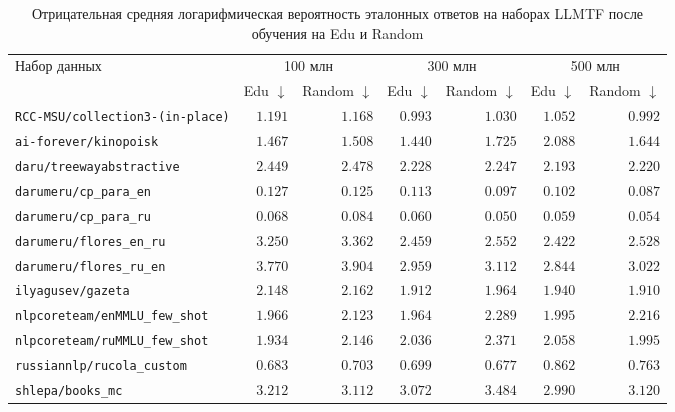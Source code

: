 \documentclass[12pt,a4paper]{article}
\begin{document}
\begin{table}[htbp]
\centering
\footnotesize
\setlength{\tabcolsep}{3pt}
\caption{Отрицательная средняя логарифмическая вероятность эталонных ответов
на наборах LLMTF после обучения на Edu и Random}
\label{tab:edu-random-pretraining}
\begin{tabular}{@{}lrrrrrr@{}}
\toprule
Набор данных & \multicolumn{2}{c}{100 млн}
& \multicolumn{2}{c}{300 млн}
& \multicolumn{2}{c}{500 млн} \\
\cmidrule(lr){2-3}\cmidrule(lr){4-5}\cmidrule(lr){6-7}
& Edu $\downarrow$ & Random $\downarrow$
& Edu $\downarrow$ & Random $\downarrow$
& Edu $\downarrow$ & Random $\downarrow$ \\
\midrule
\texttt{RCC-MSU/collection3-(in-place)}
& $1.191$ & $\mathbf{1.168}$ & $\mathbf{0.993}$ & $1.030$ & $1.052$ & $\mathbf{0.992}$ \\
\texttt{ai-forever/kinopoisk}
& $\mathbf{1.467}$ & $1.508$ & $\mathbf{1.440}$ & $1.725$ & $2.088$ & $\mathbf{1.644}$ \\
\texttt{daru/treewayabstractive}
& $\mathbf{2.449}$ & $2.478$ & $\mathbf{2.228}$ & $2.247$ & $\mathbf{2.193}$ & $2.220$ \\
\texttt{darumeru/cp\_para\_en}
& $0.127$ & $\mathbf{0.125}$ & $0.113$ & $\mathbf{0.097}$ & $0.102$ & $\mathbf{0.087}$ \\
\texttt{darumeru/cp\_para\_ru}
& $\mathbf{0.068}$ & $0.084$ & $0.060$ & $\mathbf{0.050}$ & $0.059$ & $\mathbf{0.054}$ \\
\texttt{darumeru/flores\_en\_ru}
& $\mathbf{3.250}$ & $3.362$ & $\mathbf{2.459}$ & $2.552$ & $\mathbf{2.422}$ & $2.528$ \\
\texttt{darumeru/flores\_ru\_en}
& $\mathbf{3.770}$ & $3.904$ & $\mathbf{2.959}$ & $3.112$ & $\mathbf{2.844}$ & $3.022$ \\
\texttt{ilyagusev/gazeta}
& $\mathbf{2.148}$ & $2.162$ & $\mathbf{1.912}$ & $1.964$ & $1.940$ & $\mathbf{1.910}$ \\
\texttt{nlpcoreteam/enMMLU\_few\_shot}
& $\mathbf{1.966}$ & $2.123$ & $\mathbf{1.964}$ & $2.289$ & $\mathbf{1.995}$ & $2.216$ \\
\texttt{nlpcoreteam/ruMMLU\_few\_shot}
& $\mathbf{1.934}$ & $2.146$ & $\mathbf{2.036}$ & $2.371$ & $2.058$ & $\mathbf{1.995}$ \\
\texttt{russiannlp/rucola\_custom}
& $\mathbf{0.683}$ & $0.703$ & $0.699$ & $\mathbf{0.677}$ & $0.862$ & $\mathbf{0.763}$ \\
\texttt{shlepa/books\_mc}
& $3.212$ & $\mathbf{3.112}$ & $\mathbf{3.072}$ & $3.484$ & $\mathbf{2.990}$ & $3.120$ \\

\end{tabular}
\end{table}
\end{document}
